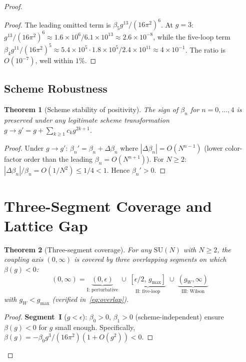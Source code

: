 \documentclass[12pt,a4paper]{article}
\theoremstyle{plain}
\newtheorem{theorem}{Theorem}[section]
\theoremstyle{definition}
\theoremstyle{remark}
\begin{document}
\begin{proof}
\begin{proof}
The leading omitted term is $\beta_5 g^{13}/(16\pi^2)^6$. At $g=3$: $g^{13}/(16\pi^2)^6\approx 1.6\times 10^{6}/6.1\times 10^{13}\approx 2.6\times 10^{-8}$, while the five-loop term $\beta_4 g^{11}/(16\pi^2)^5\approx 5.4\times 10^{5}\cdot 1.8\times 10^{5}/2.4\times 10^{11}\approx 4\times 10^{-1}$. The ratio is $O(10^{-7})$, well within $1\%$.
\end{proof}

\subsection{Scheme Robustness}\label{sec:scheme}

\begin{theorem}[Scheme stability of positivity]\label{thm:scheme}
The sign of $\beta_n$ for $n=0,\ldots,4$ is preserved under any legitimate scheme transformation $g\to g'=g+\sum_{k\geq 1}c_k g^{2k+1}$.
\end{theorem}

\begin{proof}
Under $g\to g'$: $\beta_n'=\beta_n+\Delta\beta_n$ where $|\Delta\beta_n|=O(N^{n-1})$ (lower color-factor order than the leading $\beta_n=O(N^{n+1})$). For $N\geq 2$: $|\Delta\beta_n|/\beta_n=O(1/N^2)\leq 1/4<1$. Hence $\beta_n'>0$.
\end{proof}

\section{Three-Segment Coverage and Lattice Gap}\label{sec:coverage}

\begin{theorem}[Three-segment coverage]\label{thm:coverage}
For any $\mathrm{SU}(N)$ with $N\geq 2$, the coupling axis $(0,\infty)$ is covered by three overlapping segments on which $\beta(g)<0$:
\begin{equation}\label{eq:segments}
(0,\infty) = \underbrace{(0,\epsilon)}_{\text{I: perturbative}} \;\cup\; \underbrace{[\epsilon/2,\,g_{\max}]}_{\text{II: five-loop}} \;\cup\; \underbrace{(g_W,\infty)}_{\text{III: Wilson}}
\end{equation}
with $g_W<g_{\max}$ (verified in~\eqref{eq:overlap}).
\end{theorem}

\begin{proof}
\textbf{Segment~I} ($g<\epsilon$): $\beta_0>0$, $\beta_1>0$ (scheme-independent) ensure $\beta(g)<0$ for $g$ small enough. Specifically, $\beta(g)=-\beta_0 g^3/(16\pi^2)(1+O(g^2))<0$.


\end{proof}
\end{proof}
\end{document}
